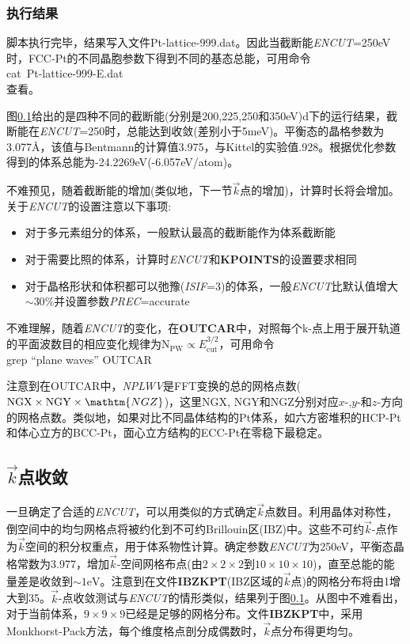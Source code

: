 \subsubsection{执行结果}
脚本执行完毕，结果写入文件\textrm{Pt-lattice-999.dat}。因此当截断能\textit{ENCUT}=250\textrm{eV}时，\textrm{FCC-Pt}的不同晶胞参数下得到不同的基态总能，可用命令\\
\textrm{cat~Pt-lattice-999-E.dat}\\
查看。

图\ref{}给出的是四种不同的截断能(分别是200,225,250和350\textrm{eV})d下的运行结果，截断能在\textit{ENCUT}=250时，总能达到收敛(差别小于5\textrm{meV})。平衡态的晶格参数为3.077\AA，该值与\textrm{Bentmann}\cite{_2008}的计算值3.975，与\textrm{Kittel}的实验值\3.928。根据优化参数得到的体系总能为-24.2269\textrm{eV}(-6.057\textrm{eV/atom})。

不难预见，随着截断能的增加(类似地，下一节$\vec k$点的增加)，计算时长将会增加。关于\textit{ENCUT}的设置注意以下事项:~
\begin{itemize}
	\item 对于多元素组分的体系，一般默认最高的截断能作为体系截断能
	\item 对于需要比照的体系，计算时\textit{ENCUT}和\textbf{KPOINTS}的设置要求相同
	\item 对于晶格形状和体积都可以弛豫(\textit{ISIF}=3)的体系，一般\textit{ENCUT}比默认值增大$\sim30\%$并设置参数\textit{PREC}=\textrm{accurate}
\end{itemize}

不难理解，随着\textit{ENCUT}的变化，在\textbf{OUTCAR}中，对照每个\textrm{k}-点上用于展开轨道的平面波数目的相应变化规律为$\mathrm{N}_{\mathrm{PW}}\propto E_{\mathrm{cut}}^{3/2}$，可用命令\\
\textrm{grep ``plane waves'' OUTCAR}

注意到在\textrm{OUTCAR}中，\textit{NPLWV}是\textrm{FFT}变换的总的网格点数($\mathrm{NGX}\times\mathrm{NGY}\times\mathtm{NGZ}$)，这里$\mathrm{NGX}$, $\mathrm{NGY}$和$\mathrm{NGZ}$分别对应$x$-,$y$-和$z$-方向的网格点数。类似地，如果对比不同晶体结构的\textrm{Pt}体系，如六方密堆积的\textrm{HCP-Pt}和体心立方的\textrm{BCC-Pt}，面心立方结构的\textrm{ECC-Pt}在零稳下最稳定。

\subsection{$\vec k$点收敛}
一旦确定了合适的\textit{ENCUT}，可以用类似的方式确定$\vec k$点数目。利用晶体对称性，倒空间中的均匀网格点将被约化到不可约\textrm{Brillouin}区(\textrm{IBZ})中。这些不可约$\vec k$-点作为$\vec k$空间的积分权重点，用于体系物性计算。确定参数\textit{ENCUT}为250\textrm{eV}，平衡态晶格常数为3.977，增加$\vec k$-空间网格布点(由$2\times2\times2$到$10\times10\times10$)，直至总能的能量差是收敛到$\sim1\mathrm{eV}$。注意到在文件\textbf{IBZKPT}(\textrm{IBZ}区域的$\vec k$点)的网格分布将由1增大到35。$\vec k$-点收敛测试与\textit{ENCUT}的情形类似，结果列于图\ref{}。从图中不难看出，对于当前体系，$9\times9\times9$已经是足够的网格分布。文件\textbf{IBZKPT}中，采用\textrm{Monkhorst-Pack}方法，每个维度格点剖分成偶数时，$\vec k$点分布得更均匀。

